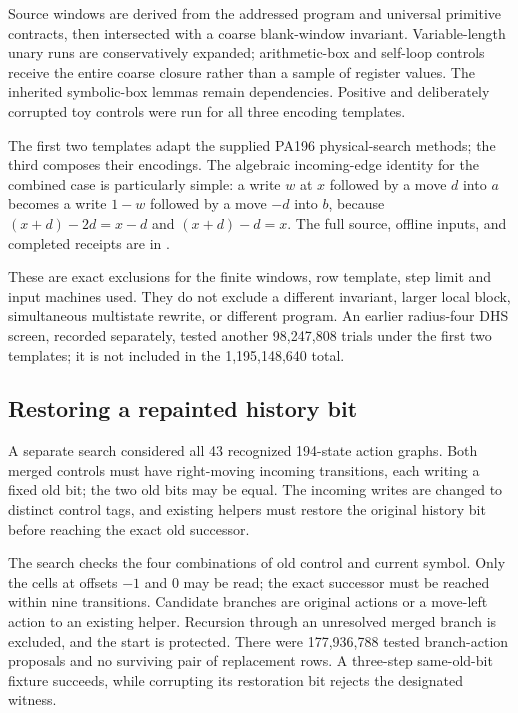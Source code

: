 \documentclass[11pt,letterpaper]{article}
\begin{document}


Source windows are derived from the addressed program and universal
primitive contracts, then intersected with a coarse blank-window invariant.
Variable-length unary runs are conservatively expanded; arithmetic-box
and self-loop controls receive the entire coarse closure rather than a
sample of register values. The inherited symbolic-box lemmas remain
dependencies. Positive and deliberately corrupted toy controls were run
for all three encoding templates.

The first two templates adapt the supplied PA196 physical-search methods;
the third composes their encodings. The algebraic incoming-edge identity
for the combined case is particularly simple: a write $w$ at $x$ followed
by a move $d$ into $a$ becomes a write $1-w$ followed by a move $-d$ into
$b$, because $(x+d)-2d=x-d$ and $(x+d)-d=x$.
The full source, offline inputs, and completed receipts are in
.

These are exact exclusions for the finite windows, row template, step
limit and input machines used. They do not exclude a different invariant,
larger local block, simultaneous multistate rewrite, or different program.
An earlier radius-four DHS screen, recorded separately, tested another
98,247,808 trials under the first two templates; it is not included in
the 1,195,148,640 total.

\subsection{Restoring a repainted history bit}

A separate search considered all 43 recognized 194-state action graphs.
Both merged controls must have right-moving incoming transitions, each
writing a fixed old bit; the two old bits may be equal. The incoming writes
are changed to distinct control tags, and existing helpers must restore
the original history bit before reaching the exact old successor.

The search checks the four combinations of old control and current symbol.
Only the cells at offsets $-1$ and $0$ may be read; the exact successor
must be reached within nine transitions. Candidate branches are original
actions or a move-left action to an existing helper. Recursion through
an unresolved merged branch is excluded, and the start is protected.
There were 177,936,788 tested branch-action proposals and no surviving
pair of replacement rows. A three-step same-old-bit fixture succeeds,
while corrupting its restoration bit rejects the designated witness.
\end{document}
